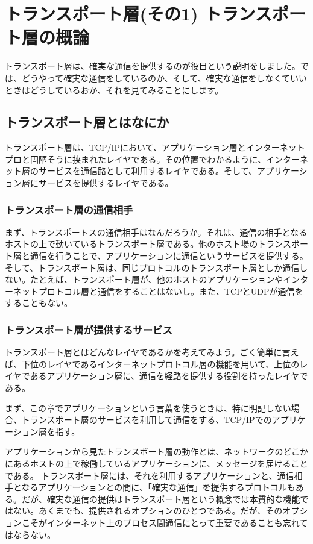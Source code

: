 \chapter{トランスポート層(その1) トランスポート層の概論}

トランスポート層は、確実な通信を提供するのが役目という説明をしました。では、どうやって確実な通信をしているのか、そして、確実な通信をしなくていいときはどうしているおか、それを見てみることにします。

\section{トランスポート層とはなにか}

トランスポート層は、TCP/IPにおいて、アプリケーション層とインターネットプロと固陋そうに挟まれたレイヤである。その位置でわかるように、インターネット層のサービスを通信路として利用するレイヤである。そして、アプリケーション層にサービスを提供するレイヤである。

\subsection{トランスポート層の通信相手}
まず、トランスポートスの通信相手はなんだろうか。それは、通信の相手となるホストの上で動いているトランスポート層である。他のホスト場のトランスポート層と通信を行うことで、アプリケーションに通信というサービスを提供する。
そして、トランスポート層は、同じプロトコルのトランスポート層としか通信しない。たとえば、トランスポート層が、他のホストのアプリケーションやインターネットプロトコル層と通信をすることはないし。また、TCPとUDPが通信をすることもない。

\subsection{トランスポート層が提供するサービス}

トランスポート層とはどんなレイヤであるかを考えてみよう。ごく簡単に言えば、下位のレイヤであるインターネットプロトコル層の機能を用いて、上位のレイヤであるアプリケーション層に、通信を経路を提供する役割を持ったレイヤである。

まず、この章でアプリケーションという言葉を使うときは、特に明記しない場合、トランスポート層のサービスを利用して通信をする、TCP/IPでのアプリケーション層を指す。

アプリケーションから見たトランスポート層の動作とは、ネットワークのどこかにあるホストの上で稼働しているアプリケーションに、メッセージを届けることである。
トランスポート層には、それを利用するアプリケーションと、通信相手となるアプリケーションとの間に、「確実な通信」を提供するプロトコルもある。だが、確実な通信の提供はトランスポート層という概念では本質的な機能ではない。あくまでも、提供されるオプションのひとつである。だが、そのオプションこそがインターネット上のプロセス間通信にとって重要であることも忘れてはならない。

